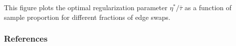 \documentclass[xcolor=dvipsnames]{beamer}
\begin{document}
\begin{frame}
    \begin{center}
    \vspace{-2em}
  \end{center}
This figure plots the optimal regularization parameter 
$\eta^\ast / \bar \tau$ as a function of sample proportion for different
fractions of edge swaps.
\end{frame}

\begin{frame}
  \frametitle{References}
  
  \footnotesize{
    
  }
\end{frame}
\end{document}
